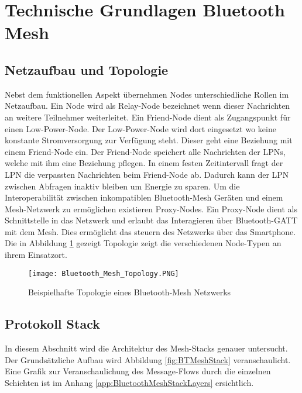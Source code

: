 \clearpage
\section{Technische Grundlagen Bluetooth Mesh}\label{sec:TechnischeGrundlagenBluetoothMesh}




\subsection{Netzaufbau und Topologie}\label{sec:NetzaufbauundTopologie}

Nebst dem funktionellen Aspekt übernehmen Nodes unterschiedliche Rollen im Netzaufbau. Ein Node wird als Relay-Node bezeichnet wenn dieser Nachrichten an weitere Teilnehmer weiterleitet. Ein Friend-Node dient als Zugangspunkt für einen Low-Power-Node. Der Low-Power-Node wird dort eingesetzt wo keine konstante Stromversorgung zur Verfügung steht. Dieser geht eine Beziehung mit einem Friend-Node ein. Der Friend-Node speichert alle Nachrichten der LPNs, welche mit ihm eine Beziehung pflegen. In einem festen Zeitintervall fragt der LPN die verpassten Nachrichten beim Friend-Node ab. Dadurch kann der LPN zwischen Abfragen inaktiv bleiben um Energie zu sparen. Um die Interoperabilität zwischen inkompatiblen Bluetooth-Mesh Geräten und einem Mesh-Netzwerk zu ermöglichen existieren Proxy-Nodes. Ein Proxy-Node dient als Schnittstelle in das Netzwerk und erlaubt das Interagieren über Bluetooth-GATT mit dem Mesh. Dies ermöglicht das steuern des Netzwerks über das Smartphone. Die in Abbildung \ref{fig:BTMeshTopology} gezeigt Topologie zeigt die verschiedenen Node-Typen an ihrem Einsatzort. 

\begin{figure} [H]
	\centering
	\texttt{[image: Bluetooth\_Mesh\_Topology.PNG]}
	\caption{Beispielhafte Topologie eines Bluetooth-Mesh Netzwerks \cite{bluetooth_sig_mesh_netzwerk_spezifikationen_2020}} 
	\label{fig:BTMeshTopology}
\end{figure}


\subsection{Protokoll Stack}\label{sec:BLEMeshProtokollStack}

In diesem Abschnitt wird die Architektur des Mesh-Stacks genauer untersucht. Der Grundsätzliche Aufbau wird Abbildung \ref{fig:BTMeshStack} veranschaulicht. Eine Grafik zur Veranschaulichung des Message-Flows durch die einzelnen Schichten ist im Anhang \ref{app:BluetoothMeshStackLayers} ersichtlich. 

